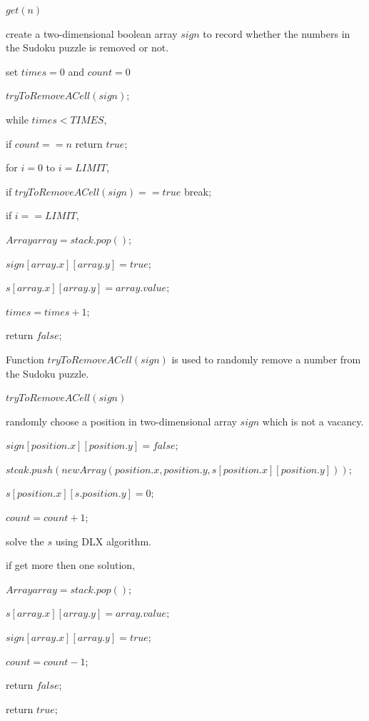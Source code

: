 \documentclass{mcmthesis}
\begin{document}
\begin{framed}
\begin{list}{.}
{\setlength{\parsep}{0ex}\setlength{\itemsep}{0ex}}
\item[] $get(n)$
\item[] create a two-dimensional boolean array $sign$ to record whether the numbers in the Sudoku puzzle is removed or not.
\item[] set $times = 0$ and $count = 0$
\item[] $tryToRemoveACell(sign)$;
\item[] while $times < TIMES$,
\item[] \qquad if $count == n$ return $true$;
\item[] \qquad for $i = 0$ to $i = LIMIT$,
\item[] \qquad\qquad if $tryToRemoveACell(sign) == true$ break;
\item[] \qquad if $i == LIMIT$,
\item[] \qquad\qquad $Array array = stack.pop()$;
\item[] \qquad\qquad $sign[array.x][array.y] = true$;
\item[] \qquad\qquad $s[array.x][array.y] = array.value$;
\item[] \qquad $times = times + 1$;
\item[] return $false$;
\end{list}
\end{framed}

Function $tryToRemoveACell(sign)$ is used to randomly remove a number from the Sudoku puzzle.

\begin{framed}
\begin{list}{.}
{\setlength{\parsep}{0ex}\setlength{\itemsep}{0ex}}
\item[] $tryToRemoveACell(sign)$
\item[] randomly choose a position in two-dimensional array $sign$ which is not a vacancy.
\item[] $sign[position.x][position.y] = false$;
\item[] $stcak.push(new Array(position.x, position.y, s[position.x][position.y]))$;
\item[] $s[position.x][s.position.y] = 0$;
\item[] $count = count + 1$;
\item[] solve the $s$ using DLX algorithm.
\item[] if get more then one solution,
\item[] \qquad $Array array = stack.pop()$;
\item[] \qquad $s[array.x][array.y] = array.value$;
\item[] \qquad $sign[array.x][array.y] = true$;
\item[] \qquad $count = count -1$;
\item[] \qquad return $false$;
\item[] return $true$;
\end{list}
\end{framed}
\end{document}
